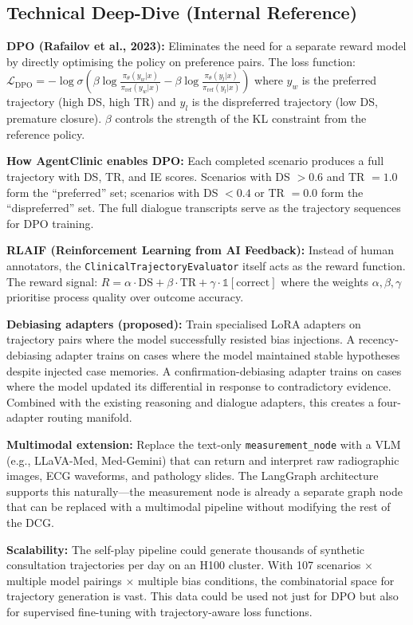 \subsection*{Technical Deep-Dive (Internal Reference)}
{\color{techgray}
\textbf{DPO (Rafailov et al., 2023):} Eliminates the need for a separate reward model by directly optimising the policy on preference pairs. The loss function:
$\mathcal{L}_{\text{DPO}} = -\log \sigma\left(\beta \log \frac{\pi_\theta(y_w | x)}{\pi_{\text{ref}}(y_w | x)} - \beta \log \frac{\pi_\theta(y_l | x)}{\pi_{\text{ref}}(y_l | x)}\right)$
where $y_w$ is the preferred trajectory (high DS, high TR) and $y_l$ is the dispreferred trajectory (low DS, premature closure). $\beta$ controls the strength of the KL constraint from the reference policy.

\textbf{How AgentClinic enables DPO:} Each completed scenario produces a full trajectory with DS, TR, and IE scores. Scenarios with DS $> 0.6$ and TR $= 1.0$ form the ``preferred'' set; scenarios with DS $< 0.4$ or TR $= 0.0$ form the ``dispreferred'' set. The full dialogue transcripts serve as the trajectory sequences for DPO training.

\textbf{RLAIF (Reinforcement Learning from AI Feedback):} Instead of human annotators, the \texttt{ClinicalTrajectoryEvaluator} itself acts as the reward function. The reward signal: $R = \alpha \cdot \text{DS} + \beta \cdot \text{TR} + \gamma \cdot \mathbb{1}[\text{correct}]$ where the weights $\alpha, \beta, \gamma$ prioritise process quality over outcome accuracy.

\textbf{Debiasing adapters (proposed):} Train specialised LoRA adapters on trajectory pairs where the model successfully resisted bias injections. A recency-debiasing adapter trains on cases where the model maintained stable hypotheses despite injected case memories. A confirmation-debiasing adapter trains on cases where the model updated its differential in response to contradictory evidence. Combined with the existing reasoning and dialogue adapters, this creates a four-adapter routing manifold.

\textbf{Multimodal extension:} Replace the text-only \texttt{measurement\_node} with a VLM (e.g., LLaVA-Med, Med-Gemini) that can return and interpret raw radiographic images, ECG waveforms, and pathology slides. The LangGraph architecture supports this naturally---the measurement node is already a separate graph node that can be replaced with a multimodal pipeline without modifying the rest of the DCG.

\textbf{Scalability:} The self-play pipeline could generate thousands of synthetic consultation trajectories per day on an H100 cluster. With 107 scenarios $\times$ multiple model pairings $\times$ multiple bias conditions, the combinatorial space for trajectory generation is vast. This data could be used not just for DPO but also for supervised fine-tuning with trajectory-aware loss functions.
}


